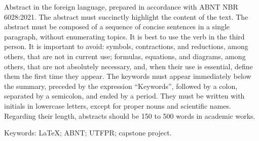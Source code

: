 Abstract in the foreign language, prepared in accordance with ABNT NBR 6028:2021. The abstract must succinctly highlight the content of the text. The abstract must be composed of a sequence of concise sentences in a single paragraph, without enumerating topics. It is best to use the verb in the third person. It is important to avoid: symbols, contractions, and reductions, among others, that are not in current use; formulas, equations, and diagrams, among others, that are not absolutely necessary, and, when their use is essential, define them the first time they appear. The keywords must appear immediately below the summary, preceded by the expression \enquote{Keywords}, followed by a colon, separated by a semicolon, and ended by a period. They must be written with initials in lowercase letters, except for proper nouns and scientific names. Regarding their length, abstracts should be 150 to 500 words in academic works.

\vspace{\onelineskip}
\noindent Keywords: LaTeX; ABNT; UTFPR; capstone project.

